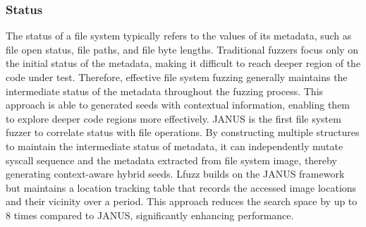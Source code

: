 
\subsubsection{Status} The status of a file system typically refers to the values of its metadata, such as file open status, file paths, and file byte lengths. Traditional fuzzers focus only on the initial status of the metadata, making it difficult to reach deeper region of the code under test. Therefore, effective file system fuzzing generally maintains the intermediate status of the metadata throughout the fuzzing process. This approach is able to generated seeds with contextual information, enabling them to explore deeper code regions more effectively. JANUS \cite{JANUS2019fuzzing} is the first file system fuzzer to correlate status with file operations. By constructing multiple structures to maintain the intermediate status of metadata, it can independently mutate syscall sequence and the metadata extracted from file system image, thereby generating context-aware hybrid seeds.  Lfuzz \cite{Liu2023LFuzz} builds on the JANUS framework but maintains a location tracking table that records the accessed image locations and their vicinity over a period. This approach reduces the search space by up to 8 times compared to JANUS, significantly enhancing performance.

